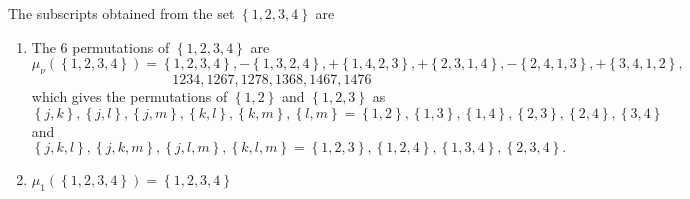 \documentclass[aps,preprint]{revtex4}%
\begin{document}
The subscripts obtained from the set $\left\{  1,2,3,4\right\}  $
are\label{The subscripts obtained from the set}

\begin{enumerate}
\item The $6$ permutations of $\left\{  1,2,3,4\right\}  $ are
\begin{equation}
\mu_{\nu}\left(  \left\{  1,2,3,4\right\}  \right)  =\left\{  1,2,3,4\right\}
,-\left\{  1,3,2,4\right\}  ,+\left\{  1,4,2,3\right\}  ,+\left\{
2,3,1,4\right\}  ,-\left\{  2,4,1,3\right\}  ,+\left\{  3,4,1,2\right\}  ,
\end{equation}%
\begin{equation}
1234,1267,1278,1368,1467,1476
\end{equation}
which gives the permutations of $\left\{  1,2\right\}  $ and $\left\{
1,2,3\right\}  $ as%
\begin{equation}
\left\{  j,k\right\}  ,\left\{  j,l\right\}  ,\left\{  j,m\right\}  ,\left\{
k,l\right\}  ,\left\{  k,m\right\}  ,\left\{  l,m\right\}  =\left\{
1,2\right\}  ,\left\{  1,3\right\}  ,\left\{  1,4\right\}  ,\left\{
2,3\right\}  ,\left\{  2,4\right\}  ,\left\{  3,4\right\}
\end{equation}
and%
\begin{equation}
\left\{  j,k,l\right\}  ,\left\{  j,k,m\right\}  ,\left\{  j,l,m\right\}
,\left\{  k,l,m\right\}  =\left\{  1,2,3\right\}  ,\left\{  1,2,4\right\}
,\left\{  1,3,4\right\}  ,\left\{  2,3,4\right\}  .
\end{equation}


\item $\mu_{1}\left(  \left\{  1,2,3,4\right\}  \right)  =\left\{
1,2,3,4\right\}  $


\end{enumerate}
\end{document}
